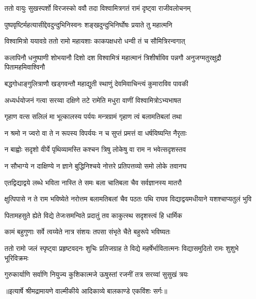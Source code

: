 \twolineshloka
{ततो वायुः सुखस्पर्शो विरजस्को ववौ तदा}
{विश्वामित्रगतं रामं दृष्ट्वा राजीवलोचनम्} %

\twolineshloka
{पुष्पवृष्टिर्महत्यासीद्देवदुन्दुभिनिस्वनः}
{शङ्खदुन्दुभिनिर्घोषः प्रयाते तु महात्मनि} %

\twolineshloka
{विश्वामित्रो ययावग्रे ततो रामो महायशाः}
{काकपक्षधरो धन्वी तं च सौमित्रिरन्वगात्} %

\threelineshloka
{कलापिनौ धनुष्पाणी शोभयानौ दिशो दश}
{विश्वामित्रं महात्मानं त्रिशीर्षाविव पन्नगौ}
{अनुजग्मतुरक्षुद्रौ पितामहमिवाश्विनौ} %

\twolineshloka
{बद्धगोधाङ्गुलित्राणौ खड्गवन्तौ महाद्युती}
{स्थाणुं देवमिवाचिन्त्यं कुमाराविव पावकी} %

\twolineshloka
{अध्यर्धयोजनं गत्वा सरय्वा दक्षिणे तटे}
{रामेति मधुरा वाणीं विश्वामित्रोऽभ्यभाषत} %

\twolineshloka
{गृहाण वत्स सलिलं मा भूत्कालस्य पर्ययः}
{मन्त्रग्रामं गृहाण त्वं बलामतिबलां तथा} %

\twolineshloka
{न श्रमो न ज्वरो वा ते न रूपस्य विपर्ययः}
{न च सुप्तं प्रमत्तं वा धर्षयिष्यन्ति नैरृताः} %

\twolineshloka
{न बाह्वोः सदृशो वीर्ये पृथिव्यामस्ति कश्चन}
{त्रिषु लोकेषु वा राम न भवेत्सदृशस्तव} %

\twolineshloka
{न सौभाग्ये न दाक्षिण्ये न ज्ञाने बुद्धिनिश्चये}
{नोत्तरे प्रतिपत्तव्यो समो लोके तवानघ} %

\twolineshloka
{एतद्विद्याद्वये लब्धे भविता नास्ति ते समः}
{बला चातिबला चैव सर्वज्ञानस्य मातरौ} %

\threelineshloka
{क्षुत्पिपासे न ते राम भविष्येते नरोत्तम}
{बलामतिबलां चैव पठतः पथि राघव}
{विद्याद्वयमधीयाने यशश्चाप्यतुलं भुवि} %

\twolineshloka
{पितामहसुते ह्येते विद्ये तेजःसमन्विते}
{प्रदातुं तव काकुत्स्थ सदृशस्त्वं हि धार्मिक} %

\twolineshloka
{कामं बहुगुणाः सर्वे त्वय्येते नात्र संशयः}
{तपसा संभृते चैते बहुरूपे भविष्यतः} %

\threelineshloka
{ततो रामो जलं स्पृष्ट्वा प्रहृष्टवदनः शुचिः}
{प्रतिजग्राह ते विद्ये महर्षेर्भावितात्मनः}
{विद्यासमुदितो रामः शुशुभे भूरिविक्रमः} %

\twolineshloka
{गुरुकार्याणि सर्वाणि नियुज्य कुशिकात्मजे}
{ऊषुस्तां रजनीं तत्र सरय्वां सुसुखं त्रयः} %


{॥इत्यार्षे श्रीमद्रामायणे वाल्मीकीये आदिकाव्ये बालकाण्डे एकविंशः सर्गः॥}

